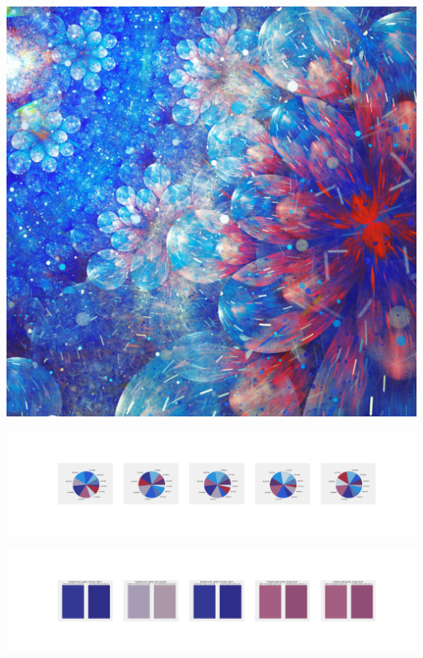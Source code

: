 \documentclass[11pt]{article}
\begin{document}
\begin{landscape}
    \begin{center}
    \includegraphics[width=\textwidth]{./nbimg/file (346).jpg}
    \end{center}

    \begin{center}
    \includegraphics[width=250mm]{./nbimg/pie-274.jpg}
    \end{center}

    \begin{center}
    \includegraphics[width=250mm]{./nbimg/peak-274.jpg}
    \end{center}
    


\end{landscape}
\end{document}
